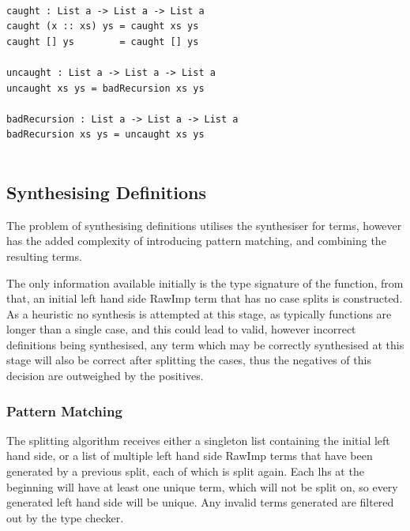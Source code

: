 \documentclass[a4paper]{article}
\begin{document}
\begin{center}
  \begin{verbatim}

caught : List a -> List a -> List a
caught (x :: xs) ys = caught xs ys
caught [] ys        = caught [] ys

uncaught : List a -> List a -> List a
uncaught xs ys = badRecursion xs ys

badRecursion : List a -> List a -> List a
badRecursion xs ys = uncaught xs ys
    
  \end{verbatim}
\end{center}


\subsection{Synthesising Definitions}
\label{sec:org7318356}

The problem of synthesising definitions utilises the synthesiser for
terms, however has the added complexity of introducing pattern matching, 
and combining the resulting terms. 

The only information available initially is the type 
signature of the function, from that, an initial left hand side RawImp
term that has no case splits is constructed. As a heuristic no synthesis 
is attempted at this stage, as typically functions are longer than a single 
case, and this could lead to valid, however incorrect definitions being
synthesised, any term which may be correctly synthesised at this stage will 
also be correct after splitting the cases, thus the negatives of this decision
are outweighed by the positives.

\subsubsection{Pattern Matching}
\label{sec:org38930cc}
The splitting algorithm receives either a singleton list containing the initial
left hand side, or a list of multiple left hand side RawImp terms that have been generated by a previous split, 
each of which is split again. Each lhs at the beginning will have
at least one unique term, which will not be split on, so every generated
left hand side will be unique. Any invalid terms generated are filtered out by 
the type checker. 
\end{document}
